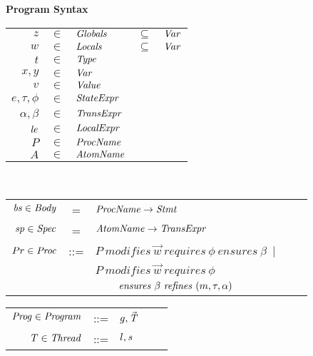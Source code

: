 

\begin{figure}
\setlength{\tabcolsep}{3pt}
{\bf Program Syntax} \\
\begin{tabular}{rclcl}
$z$ & $\in$ & $\mathit{Globals}$ & $\subseteq$ &$\mathit{Var}$ \\
$w$ & $\in$ & $\mathit{Locals}$ & $\subseteq$ & $\mathit{Var}$ \\
$t$ & $\in$ & $\mathit{Type}$ \\
$x,y$ & $\in$ & $\mathit{Var}$ \\
$v$ &  $\in$ & $\mathit{Value}$ \\
$e, \tau, \phi$ & $\in$ & $\mathit{StateExpr}$ \\
$\alpha, \beta$ & $\in$ & $\mathit{TransExpr}$ \\
$\mathit{le}$ & $\in$ & $\mathit{LocalExpr}$ \\
$P$ & $\in$ & $\mathit{ProcName}$ \\
$A$ & $\in$ & $\mathit{AtomName}$ \\
\end{tabular}\\
\begin{tabular}{rclcl}
$\mathit{bs} \in \mathit{Body}$ & = & $\mathit{ProcName} \rightarrow \mathit{Stmt}$ \\
$\mathit{sp} \in \mathit{Spec}$ & = & $\mathit{AtomName} \rightarrow \mathit{TransExpr}$ \\
$Pr \in \mathit{Proc}$ &::= & $P\ \mathit{modifies}\ \overrightarrow{w}\ 
                                                        \mathit{requires}\ \phi\
                                                        \mathit{ensures}\ \beta\ \mid $\\
& & $P\ \mathit{modifies}\ \overrightarrow{w}\ 
                     \mathit{requires}\ \phi\ $\\
& &                     $\hspace*{0.8cm} \mathit{ensures}\ \beta\
                     \mathit{refines}\ (m, \tau, \alpha)$\\
\end{tabular}
\begin{tabular}{rclcl}
$\mathit{Prog} \in \mathit{Program}$ & ::= & $g, \vec{\mathit{T}}$ \\
$T \in \mathit{Thread}$ & ::=  & $l, \mathit{s}$ \\

\end{tabular}
\end{figure}
